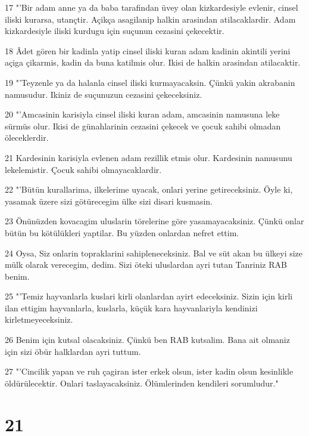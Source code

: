 \par 17 "'Bir adam anne ya da baba tarafindan üvey olan kizkardesiyle evlenir, cinsel iliski kurarsa, utançtir. Açikça asagilanip halkin arasindan atilacaklardir. Adam kizkardesiyle iliski kurdugu için suçunun cezasini çekecektir.
\par 18 Âdet gören bir kadinla yatip cinsel iliski kuran adam kadinin akintili yerini açiga çikarmis, kadin da buna katilmis olur. Ikisi de halkin arasindan atilacaktir.
\par 19 "'Teyzenle ya da halanla cinsel iliski kurmayacaksin. Çünkü yakin akrabanin namusudur. Ikiniz de suçunuzun cezasini çekeceksiniz.
\par 20 "'Amcasinin karisiyla cinsel iliski kuran adam, amcasinin namusuna leke sürmüs olur. Ikisi de günahlarinin cezasini çekecek ve çocuk sahibi olmadan öleceklerdir.
\par 21 Kardesinin karisiyla evlenen adam rezillik etmis olur. Kardesinin namusunu lekelemistir. Çocuk sahibi olmayacaklardir.
\par 22 "'Bütün kurallarima, ilkelerime uyacak, onlari yerine getireceksiniz. Öyle ki, yasamak üzere sizi götürecegim ülke sizi disari kusmasin.
\par 23 Önünüzden kovacagim uluslarin törelerine göre yasamayacaksiniz. Çünkü onlar bütün bu kötülükleri yaptilar. Bu yüzden onlardan nefret ettim.
\par 24 Oysa, Siz onlarin topraklarini sahipleneceksiniz. Bal ve süt akan bu ülkeyi size mülk olarak verecegim, dedim. Sizi öteki uluslardan ayri tutan Tanriniz RAB benim.
\par 25 "'Temiz hayvanlarla kuslari kirli olanlardan ayirt edeceksiniz. Sizin için kirli ilan ettigim hayvanlarla, kuslarla, küçük kara hayvanlariyla kendinizi kirletmeyeceksiniz.
\par 26 Benim için kutsal olacaksiniz. Çünkü ben RAB kutsalim. Bana ait olmaniz için sizi öbür halklardan ayri tuttum.
\par 27 "'Cincilik yapan ve ruh çagiran ister erkek olsun, ister kadin olsun kesinlikle öldürülecektir. Onlari taslayacaksiniz. Ölümlerinden kendileri sorumludur."

\chapter{21}

